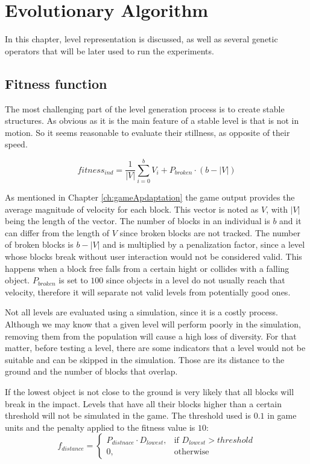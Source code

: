\chapter{Evolutionary Algorithm}\label{ch:Representation}

In this chapter, level representation is discussed, as well as several genetic operators that will be later used to run the experiments. 

\section{Fitness function}

The most challenging part of the level generation process is to create stable structures. As obvious as it is the main feature of a stable level is that is not in motion. So it seems reasonable to evaluate their stillness, as opposite of their speed. 

$$fitness_{ind} = \frac{1}{|V|}\sum_{i=0}^{b}{V_i} + P_{broken}\cdot(b-|V|)$$

As mentioned in Chapter \ref{ch:gameApdaptation} the game output provides the average magnitude of velocity for each block. This vector is noted as $V$, with $|V|$ being the length of the vector. The number of blocks in an individual is $b$ and it can differ from the length of $V$ since broken blocks are not tracked. The number of broken blocks is $b-|V|$ and is multiplied by a penalization factor, since a level whose blocks break without user interaction would not be considered valid. This happens when a block free falls from a certain hight or collides with a falling object. $P_{broken}$ is set to $100$ since objects in a level do not usually reach that velocity, therefore it will separate not valid levels from potentially good ones.

Not all levels are evaluated using a simulation, since it is a costly process. Although we may know that a given level will perform poorly in the simulation, removing them from the population will cause a high loss of diversity. For that matter, before testing a level, there are some indicators that a level would not be suitable and can be skipped in the simulation. Those are its distance to the ground and the number of blocks that overlap.

If the lowest object is not close to the ground is very likely that all blocks will break in the impact. Levels that have all their blocks higher than a certain threshold will not be simulated in the game. The threshold used is $0.1$ in game units and the penalty applied to the fitness value is $10$:
$$f_{distance} =
\begin{cases}
P_{distnace}\cdot D_{lowest},& \text{if } D_{lowest} > threshold\\
0,              & \text{otherwise}
\end{cases}
 $$

